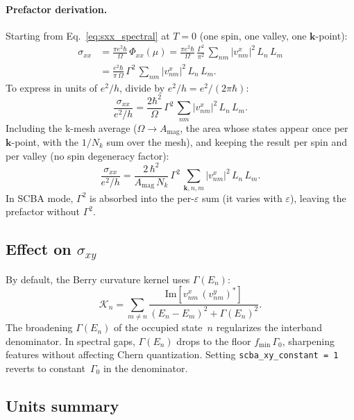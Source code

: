 \documentclass[11pt]{article}
\newcommand{\Gam}{\Gamma}
\newcommand{\eps}{\varepsilon}
\newcommand{\Nk}{N_k}
\begin{document}
\paragraph{Prefactor derivation.}  Starting from Eq.~\eqref{eq:sxx_spectral}
at $T=0$ (one spin, one valley, one $\mathbf{k}$-point):
\begin{align}
  \sigma_{xx} &= \frac{\pi e^2 \hbar}{\Omega}\, \Phi_{xx}(\mu)
  = \frac{\pi e^2 \hbar}{\Omega}\, \frac{\Gam^2}{\pi^2}\,
  \sum_{nm} |v^x_{nm}|^2\, L_n\, L_m \nonumber \\
  &= \frac{e^2 \hbar}{\pi\,\Omega}\, \Gam^2\,
  \sum_{nm} |v^x_{nm}|^2\, L_n\, L_m.
\end{align}
To express in units of $e^2/h$, divide by $e^2/h = e^2/(2\pi\hbar)$:
\begin{equation}
  \frac{\sigma_{xx}}{e^2/h}
  = \frac{2\hbar^2}{\Omega}\, \Gam^2\, \sum_{nm} |v^x_{nm}|^2\, L_n\, L_m.
\end{equation}
Including the k-mesh average
($\Omega \to A_{\mathrm{mag}}$, the area whose states appear once per
$\mathbf{k}$-point, with the $1/\Nk$ sum over the mesh), and keeping
the result per spin and per valley (no spin degeneracy factor):
\begin{equation}
  \frac{\sigma_{xx}}{e^2/h}
  = \frac{2\, \hbar^2}{A_{\mathrm{mag}}\,\Nk}\, \Gam^2\,
  \sum_{\mathbf{k},n,m} |v^x_{nm}|^2\, L_n\, L_m.
\end{equation}
In SCBA mode, $\Gam^2$ is absorbed into the per-$\eps$ sum (it varies
with $\eps$), leaving the prefactor without $\Gam^2$.

\subsection{Effect on $\sigma_{xy}$}

By default, the Berry curvature kernel uses $\Gam(E_n)$:
\begin{equation}
  \mathcal{K}_n = \sum_{m \neq n}
  \frac{\mathrm{Im}[v^x_{nm}\,(v^y_{nm})^*]}{(E_n - E_m)^2 + \Gam(E_n)^2}.
\end{equation}
The broadening $\Gam(E_n)$ of the occupied state~$n$ regularizes the
interband denominator.  In spectral gaps, $\Gam(E_n)$ drops to the
floor $f_{\min}\,\Gam_0$, sharpening features without affecting
Chern quantization.  Setting \texttt{scba\_xy\_constant = 1} reverts
to constant~$\Gam_0$ in the denominator.

\subsection{Units summary}
\end{document}
